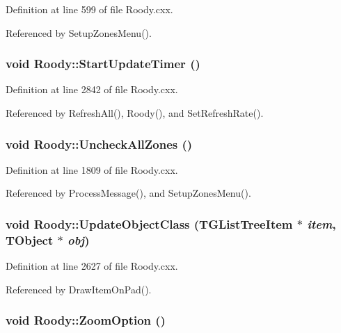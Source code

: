 Definition at line 599 of file Roody.cxx.

Referenced by SetupZonesMenu().
\subsubsection[{StartUpdateTimer}]{\setlength{\rightskip}{0pt plus 5cm}void Roody::StartUpdateTimer ()\hspace{0.3cm}{\ttfamily  [private]}}\label{classRoody_a07166d648c44522d6f3a393a1247fadb}


Definition at line 2842 of file Roody.cxx.

Referenced by RefreshAll(), Roody(), and SetRefreshRate().
\subsubsection[{UncheckAllZones}]{\setlength{\rightskip}{0pt plus 5cm}void Roody::UncheckAllZones ()\hspace{0.3cm}{\ttfamily  [private]}}\label{classRoody_ad0c58fa023ce6ac08530e7719782525b}


Definition at line 1809 of file Roody.cxx.

Referenced by ProcessMessage(), and SetupZonesMenu().
\subsubsection[{UpdateObjectClass}]{\setlength{\rightskip}{0pt plus 5cm}void Roody::UpdateObjectClass (TGListTreeItem $\ast$ {\em item}, \/  TObject $\ast$ {\em obj})\hspace{0.3cm}{\ttfamily  [private]}}\label{classRoody_ab9d83ccd3387124292a7b16004738721}


Definition at line 2627 of file Roody.cxx.

Referenced by DrawItemOnPad().
\subsubsection[{ZoomOption}]{\setlength{\rightskip}{0pt plus 5cm}void Roody::ZoomOption ()}\label{classRoody_a191221f28aa08363462ef3d7ee3b5a5e}


